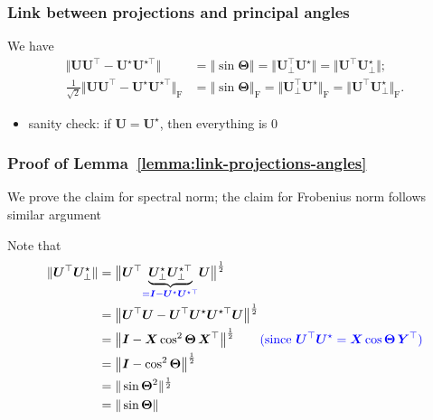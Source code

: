 \documentclass[compress,
mathserif,wide,%
]{beamer}
\begin{document}
\begin{frame}
	\frametitle{Link between projections and principal angles}
	\begin{lemma}\label{lemma:link-projections-angles}
We have 
%
\begin{subequations}
\begin{align*}
	\big\Vert \bm{U}\bm{U}^{\top}-{\bm{U}}^{\star}{\bm{U}}^{\star\top}\big\Vert
	& =\left\Vert \sin\bm{\Theta}\right\Vert  = \big\Vert \bm{U}_{\perp}^{\top}\bm{U}^{\star}\big\Vert = \big\Vert \bm{U}^{\top}\bm{U}_{\perp}^{\star}\big\Vert ; \\
	\tfrac{1}{\sqrt{2}} \big\Vert \bm{U}\bm{U}^{\top}-{\bm{U}}^{\star}{\bm{U}}^{\star\top}\big\Vert _{\mathrm{F}}
	& =\left\Vert \sin\bm{\Theta}\right\Vert _{\mathrm{F}}
	=  \big\Vert \bm{U}_{\perp}^{\top}\bm{U}^{\star}\big\Vert_{\mathrm{F}} =   \big\Vert \bm{U}^{\top}\bm{U}_{\perp}^{\star} \big\Vert_{\mathrm{F}} .
\end{align*}
\end{subequations}
\end{lemma}

\begin{itemize}
	\item sanity check: if $\bm{U} = \bm{U}^\star$, then  everything is 0
\end{itemize}
%
\end{frame}





\begin{frame}
\frametitle{Proof of Lemma~\ref{lemma:link-projections-angles}}

We prove the claim for spectral norm; the claim for Frobenius norm follows similar argument

Note that
\begin{align*}
\|\bm{U}^{\top}\bm{U}^\star_{\perp}\| & = \big\| \bm{U}^{\top}\underset{\textcolor{blue}{ =\bm{I}-\bm{U}^\star\bm{U}^{\star\top}}}{\underbrace{\bm{U}^\star_{\perp}\bm{U}^{\star\top}_{\perp}}}\bm{U} \big\|^{\frac{1}{2}}\\
 & = \big\| \bm{U}^{\top}\bm{U}-\bm{U}^{\top}\bm{U}^\star\bm{U}^{\star\top}\bm{U} \big \|^{\frac{1}{2}}\\
 & = \big\| \bm{I}-\bm{X}\cos^{2}\bm{\Theta} \,\bm{X}^{\top} \big\|^{\frac{1}{2}}\qquad \textcolor{blue}{ (\text{since }\bm{U}^{\top}\bm{U}^\star=\bm{X}\cos\bm{\Theta}\,\bm{Y}^{\top})}\\
 & = \big\|\bm{I}-\cos^{2}\bm{\Theta} \big\|^{\frac{1}{2}} \\
 & = \|\sin\bm{\Theta}^2\|^{\frac{1}{2}} \\
 & =\|\sin\bm{\Theta}\|
\end{align*}

\end{frame}
\end{document}
